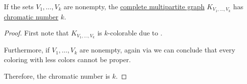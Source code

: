 \begin{proposition}\label{thm:complete_multipartite_graph_chromatic_number}
  If the sets \( V_1, \ldots, V_k \) are nonempty, the \hyperref[def:complete_multipartite_graph]{complete multipartite graph} \( K_{V_1,\ldots,V_k} \) has \hyperref[def:graph_chromatic_number]{chromatic number} \( k \).
\end{proposition}
\begin{proof}
  First note that \( K_{V_1, \ldots, V_k} \) is \( k \)-colorable due to .

  Furthermore, if \( V_1, \ldots, V_k \) are nonempty, again via  we can conclude that every coloring with less colors cannot be proper.

  Therefore, the chromatic number is \( k \).
\end{proof}

